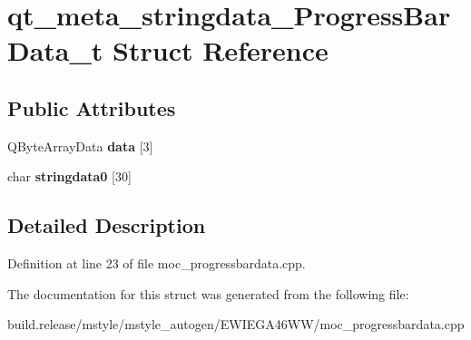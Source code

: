 \hypertarget{structqt__meta__stringdata___progress_bar_data__t}{}\section{qt\+\_\+meta\+\_\+stringdata\+\_\+\+Progress\+Bar\+Data\+\_\+t Struct Reference}
\label{structqt__meta__stringdata___progress_bar_data__t}
\subsection*{Public Attributes}
\begin{DoxyCompactItemize}
\item 
\mbox{\label{structqt__meta__stringdata___progress_bar_data__t_a2410ca0b971d616ac5eb4b548748d140}} 
Q\+Byte\+Array\+Data {\bfseries data} \mbox{[}3\mbox{]}
\item 
\mbox{\label{structqt__meta__stringdata___progress_bar_data__t_acc31a454efb2585d69ac4f708286bbc8}} 
char {\bfseries stringdata0} \mbox{[}30\mbox{]}
\end{DoxyCompactItemize}


\subsection{Detailed Description}


Definition at line 23 of file moc\+\_\+progressbardata.\+cpp.



The documentation for this struct was generated from the following file\+:\begin{DoxyCompactItemize}
\item 
build.\+release/mstyle/mstyle\+\_\+autogen/\+E\+W\+I\+E\+G\+A46\+W\+W/moc\+\_\+progressbardata.\+cpp\end{DoxyCompactItemize}
